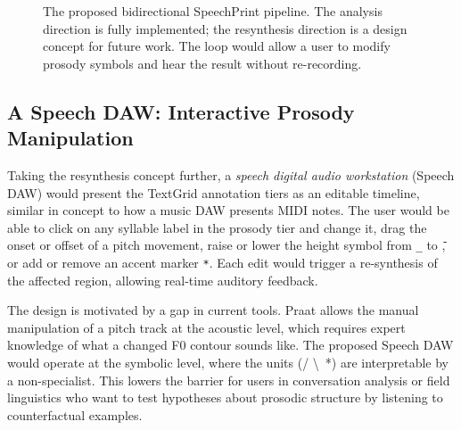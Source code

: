 \begin{figure}[htbp]
\centering
{}
\caption{The proposed bidirectional SpeechPrint pipeline. The analysis direction
is fully implemented; the resynthesis direction is a design concept for future
work. The loop would allow a user to modify prosody symbols and hear the result
without re-recording.}
\label{fig:resynthesis_pipeline}
\end{figure}

\subsection{A Speech DAW: Interactive Prosody Manipulation}
\label{sec:speech_daw}

Taking the resynthesis concept further, a \emph{speech digital audio workstation}
(Speech DAW) would present the TextGrid annotation tiers as an editable timeline,
similar in concept to how a music DAW presents MIDI notes. The user would be able
to click on any syllable label in the prosody tier and change it, drag the onset
or offset of a pitch movement, raise or lower the height symbol from \texttt{\_}
to \texttt{{\={}}}, or add or remove an accent marker \texttt{*}. Each edit would
trigger a re-synthesis of the affected region, allowing real-time auditory
feedback.

The design is motivated by a gap in current tools. Praat allows the manual
manipulation of a pitch track at the acoustic level, which requires expert
knowledge of what a changed F0 contour sounds like. The proposed Speech DAW
would operate at the symbolic level, where the units (/ \textbackslash\, *) are
interpretable by a non-specialist. This lowers the barrier for users in
conversation analysis or field linguistics who want to test hypotheses about
prosodic structure by listening to counterfactual examples.

